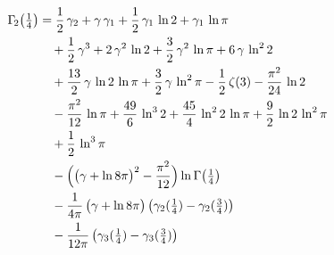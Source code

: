\documentclass[11pt]{article}
\theoremstyle{remark}
\begin{document}
\begin{align*}
\Gamma_{\!2}\bigl(\tfrac14\bigr) &= \frac{1}{2}\,\gamma_{2}+\gamma\,\gamma_{1}+\frac{1}{2}\,\gamma_{1}\,\ln 2+\gamma_{1}\,\ln \pi \\
 &\quad +\frac{1}{2}\,\gamma^{3}+2\,\gamma^{2}\,\ln 2+\frac{3}{2}\,\gamma^{2}\,\ln \pi+6\,\gamma\,\ln^{2} 2 \\
 &\quad +\frac{13}{2}\,\gamma\,\ln 2\,\ln \pi+\frac{3}{2}\,\gamma\,\ln^{2} \pi-\frac{1}{2}\,\zeta(3)-\frac{\pi^{2}}{24}\,\ln 2 \\
 &\quad -\frac{\pi^{2}}{12}\,\ln \pi+\frac{49}{6}\,\ln^{3} 2+\frac{45}{4}\,\ln^{2} 2\,\ln \pi+\frac{9}{2}\,\ln 2\,\ln^{2} \pi \\
 &\quad +\frac{1}{2}\,\ln^{3} \pi \\
 &\quad -\Bigl(\bigl(\gamma+\ln 8\pi\bigr)^{2}-\frac{\pi^{2}}{12}\Bigr)\ln\Gamma\bigl(\tfrac14\bigr) \\
 &\quad -\frac{1}{4\pi}\,\bigl(\gamma+\ln 8\pi\bigr)\,\bigl(\gamma_{2}(\tfrac14)-\gamma_{2}(\tfrac34)\bigr) \\
 &\quad -\frac{1}{12\pi}\,\bigl(\gamma_{3}(\tfrac14)-\gamma_{3}(\tfrac34)\bigr)
\end{align*}
\end{document}
